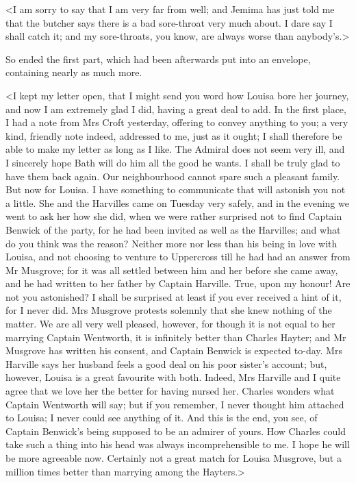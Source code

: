 <I am sorry to say that I am very far from well; and Jemima has just told me that the butcher says there is a bad sore-throat very much about. I dare say I shall catch it; and my sore-throats, you know, are always worse than anybody's.>

So ended the first part, which had been afterwards put into an envelope, containing nearly as much more.

<I kept my letter open, that I might send you word how Louisa bore her journey, and now I am extremely glad I did, having a great deal to add. In the first place, I had a note from Mrs Croft yesterday, offering to convey anything to you; a very kind, friendly note indeed, addressed to me, just as it ought; I shall therefore be able to make my letter as long as I like. The Admiral does not seem very ill, and I sincerely hope Bath will do him all the good he wants. I shall be truly glad to have them back again. Our neighbourhood cannot spare such a pleasant family. But now for Louisa. I have something to communicate that will astonish you not a little. She and the Harvilles came on Tuesday very safely, and in the evening we went to ask her how she did, when we were rather surprised not to find Captain Benwick of the party, for he had been invited as well as the Harvilles; and what do you think was the reason? Neither more nor less than his being in love with Louisa, and not choosing to venture to Uppercross till he had had an answer from Mr Musgrove; for it was all settled between him and her before she came away, and he had written to her father by Captain Harville. True, upon my honour! Are not you astonished? I shall be surprised at least if you ever received a hint of it, for I never did. Mrs Musgrove protests solemnly that she knew nothing of the matter. We are all very well pleased, however, for though it is not equal to her marrying Captain Wentworth, it is infinitely better than Charles Hayter; and Mr Musgrove has written his consent, and Captain Benwick is expected to-day. Mrs Harville says her husband feels a good deal on his poor sister's account; but, however, Louisa is a great favourite with both. Indeed, Mrs Harville and I quite agree that we love her the better for having nursed her. Charles wonders what Captain Wentworth will say; but if you remember, I never thought him attached to Louisa; I never could see anything of it. And this is the end, you see, of Captain Benwick's being supposed to be an admirer of yours. How Charles could take such a thing into his head was always incomprehensible to me. I hope he will be more agreeable now. Certainly not a great match for Louisa Musgrove, but a million times better than marrying among the Hayters.>


